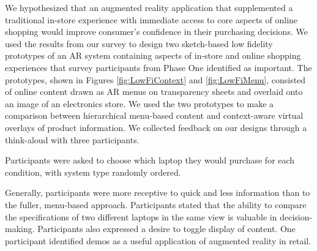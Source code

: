 We hypothesized that an augmented reality application that supplemented a traditional in-store experience with immediate access to core aspects of online shopping would improve consumer's confidence in their purchasing decisions.   We used the results from our survey to design two sketch-based low fidelity prototypes of an AR system containing aspects of in-store and online shopping experiences that survey participants from Phase One identified as important. The prototypes, shown in Figures \ref{fig:LowFiContext} and \ref{fig:LowFiMenu}, consisted of online content drawn as AR menus on transparency sheets and overlaid onto an image of an electronics store. 
We used the two prototypes to make a comparison between hierarchical menu-based content and context-aware virtual overlays of product information.
We collected feedback on our designs through a think-aloud with three participants.

Participants were asked to choose which laptop they would purchase for each condition, with system type randomly ordered.   

Generally, participants were more receptive to quick and less information than to the fuller, menu-based approach.  
Participants stated that the ability to compare the specifications of two different laptops in the same view is valuable in decision-making. Participants also expressed a desire to toggle display of content. One participant identified demos as a useful application of augmented reality in retail. 



